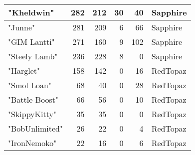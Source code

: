\documentclass{article}
\begin{document}
\begin{table}[htbp]
\begin{tabular}{|l|r|r|r|r|l|}
"Kheldwin" & 282 & 212 & 30 & 40 & Sapphire \\ \hline
"Junne" & 281 & 209 & 6 & 66 & Sapphire \\ \hline
"GIM Lantti" & 271 & 160 & 9 & 102 & Sapphire \\ \hline
"Steely Lamb" & 236 & 228 & 8 & 0 & Sapphire \\ \hline
"Harglet" & 158 & 142 & 0 & 16 & RedTopaz \\ \hline
"Smol Loan" & 68 & 40 & 0 & 28 & RedTopaz \\ \hline
"Battle Boost" & 66 & 56 & 0 & 10 & RedTopaz \\ \hline
"SkippyKitty" & 35 & 35 & 0 & 0 & RedTopaz \\ \hline
"BobUnlimited" & 26 & 22 & 0 & 4 & RedTopaz \\ \hline
"IronNemoko" & 22 & 16 & 0 & 6 & RedTopaz \\ \hline
\end{tabular}
\end{table}
\end{document}
